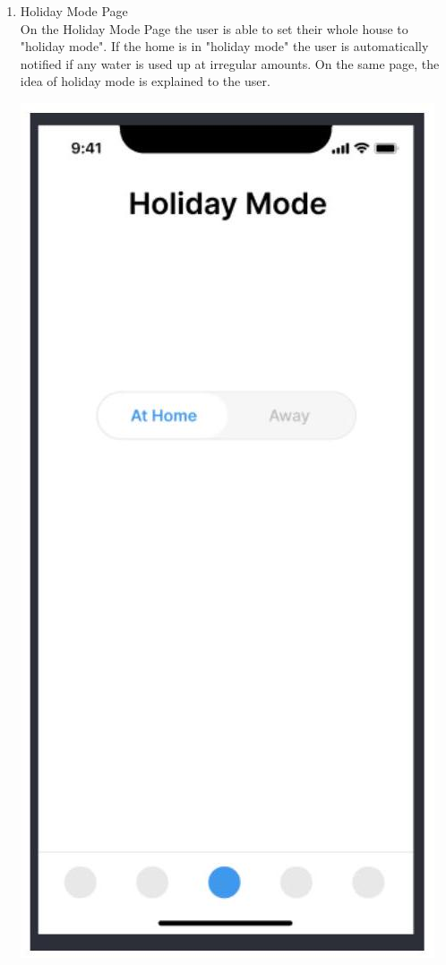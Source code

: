 \documentclass[10pt]{article}
\begin{document}
\begin{enumerate}
  \item {Holiday Mode Page} \\
  On the Holiday Mode Page the user is able to set their whole house to "holiday mode". If the home is in "holiday mode" the user is automatically notified if any water is used up at irregular amounts. On the same page, the idea of holiday mode is explained to the user.

  \includegraphics[max width=\textwidth]{2022_11_16_e80008f3d60227bff292g-7}


\end{enumerate}
\end{document}
